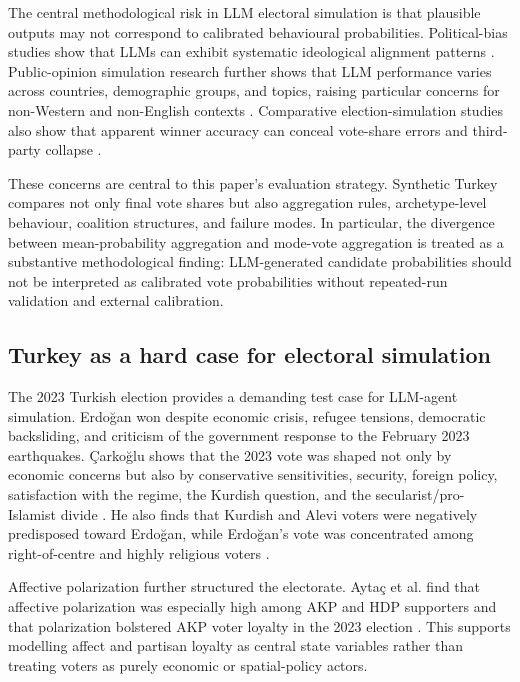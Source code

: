 \documentclass[pdflatex,sn-mathphys-num,iicol]{sn-jnl}
\begin{document}
The central methodological risk in LLM electoral simulation is that plausible outputs may not correspond to calibrated behavioural probabilities. Political-bias studies show that LLMs can exhibit systematic ideological alignment patterns \cite{rettenberger2025politicalbias}. Public-opinion simulation research further shows that LLM performance varies across countries, demographic groups, and topics, raising particular concerns for non-Western and non-English contexts \cite{qu2024performance}. Comparative election-simulation studies also show that apparent winner accuracy can conceal vote-share errors and third-party collapse \cite{kang2026dynamok}.

These concerns are central to this paper's evaluation strategy. Synthetic Turkey compares not only final vote shares but also aggregation rules, archetype-level behaviour, coalition structures, and failure modes. In particular, the divergence between mean-probability aggregation and mode-vote aggregation is treated as a substantive methodological finding: LLM-generated candidate probabilities should not be interpreted as calibrated vote probabilities without repeated-run validation and external calibration.

\subsection{Turkey as a hard case for electoral simulation}

The 2023 Turkish election provides a demanding test case for LLM-agent simulation. Erdoğan won despite economic crisis, refugee tensions, democratic backsliding, and criticism of the government response to the February 2023 earthquakes. Çarkoğlu shows that the 2023 vote was shaped not only by economic concerns but also by conservative sensitivities, security, foreign policy, satisfaction with the regime, the Kurdish question, and the secularist/pro-Islamist divide \cite{carkoglu2024unlikely}. He also finds that Kurdish and Alevi voters were negatively predisposed toward Erdoğan, while Erdoğan's vote was concentrated among right-of-centre and highly religious voters \cite{carkoglu2024unlikely}.

Affective polarization further structured the electorate. Aytaç et al. find that affective polarization was especially high among AKP and HDP supporters and that polarization bolstered AKP voter loyalty in the 2023 election \cite{aytac2025polarised}. This supports modelling affect and partisan loyalty as central state variables rather than treating voters as purely economic or spatial-policy actors.
\end{document}
